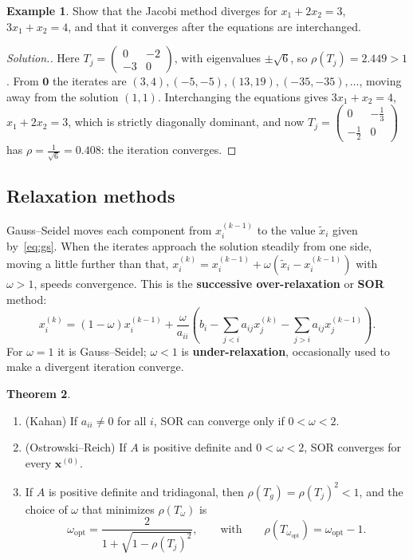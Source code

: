 \documentclass[11pt,a4paper]{article}
\numberwithin{equation}{section}
\theoremstyle{definition}
\newtheorem{thm}{Theorem}[subsection]
\newtheorem{exa}[thm]{Example}
\newenvironment{solution}
  {\renewcommand{\qedsymbol}{}\begin{proof}[\textit{Solution}.]}
  {\end{proof}}
\begin{document}
\begin{exa}
\label{exa:jacobidiverge}
Show that the Jacobi method diverges for $x_1+2x_2 = 3$, $3x_1+x_2 = 4$, and that it converges after the equations are interchanged.
\end{exa}

\begin{solution}
Here $T_j = \begin{pmatrix}0&-2\\-3&0\end{pmatrix}$, with eigenvalues $\pm\sqrt6$, so $\rho(T_j) = 2.449>1$. From $\mathbf 0$ the iterates are
$(3,4), (-5,-5), (13,19), (-35,-35),\dots$, moving away from the solution $(1,1)$. Interchanging the equations gives $3x_1+x_2 = 4$,
$x_1+2x_2 = 3$, which is strictly diagonally dominant, and now $T_j = \begin{pmatrix}0&-\frac13\\-\frac12&0\end{pmatrix}$ has $\rho = \frac1{\sqrt6} =
0.408$: the iteration converges.
\end{solution}


\subsection{Relaxation methods}
\label{sec:sor}

Gauss--Seidel moves each component from $x_i^{(k-1)}$ to the value $\tilde x_i$ given by~\eqref{eq:gs}. When the iterates approach the
solution steadily from one side, moving a little further than that, $x_i^{(k)} = x_i^{(k-1)}+\omega(\tilde x_i-x_i^{(k-1)})$ with
$\omega>1$, speeds convergence. This is the \textbf{successive over-relaxation} or \textbf{SOR} method:
\begin{equation}\label{eq:sor}
x_i^{(k)} = (1-\omega)x_i^{(k-1)}+\frac{\omega}{a_{ii}}\left(b_i-\sum_{j<i}a_{ij}x_j^{(k)}-\sum_{j>i}a_{ij}x_j^{(k-1)}\right).
\end{equation}
For $\omega = 1$ it is Gauss--Seidel; $\omega<1$ is \textbf{under-relaxation}, occasionally used to make a divergent iteration converge.

\begin{thm}
\label{thm:sor}
\begin{enumerate}
\item[(i)] (Kahan) If $a_{ii}\neq0$ for all $i$, SOR can converge only if $0<\omega<2$.
\item[(ii)] (Ostrowski--Reich) If $A$ is positive definite and $0<\omega<2$, SOR converges for every $\mathbf x^{(0)}$.
\item[(iii)] If $A$ is positive definite and tridiagonal, then $\rho(T_g) = \rho(T_j)^2<1$, and the choice of $\omega$ that minimizes
$\rho(T_\omega)$ is
$$\omega_{\text{opt}} = \frac{2}{1+\sqrt{1-\rho(T_j)^2}},\qquad\text{with}\qquad\rho(T_{\omega_{\text{opt}}}) = \omega_{\text{opt}}-1 .$$
\end{enumerate}
\end{thm}
\end{document}
